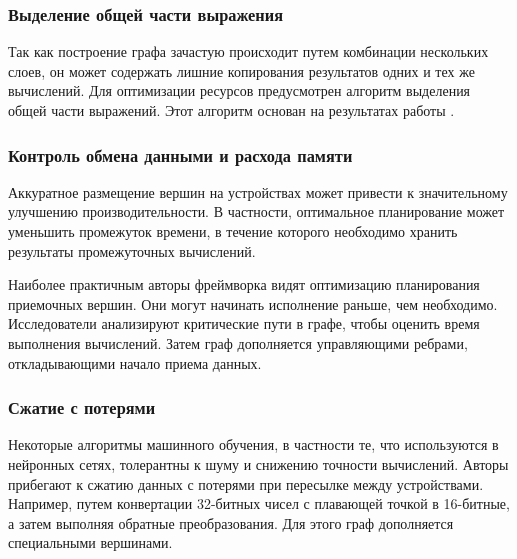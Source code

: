 \subsubsection{Выделение общей части выражения}
Так как построение графа зачастую происходит путем комбинации нескольких слоев,
он может содержать лишние копирования результатов одних и тех же вычислений.
Для оптимизации ресурсов предусмотрен алгоритм выделения общей части выражений.
Этот алгоритм основан на результатах работы \cite{click}.

\subsubsection{Контроль обмена данными и расхода памяти}

Аккуратное размещение вершин на устройствах может привести к значительному
улучшению производительности. В частности, оптимальное планирование может
уменьшить промежуток времени, в течение которого необходимо хранить результаты
промежуточных вычислений.

Наиболее практичным авторы фреймворка видят оптимизацию планирования приемочных
вершин. Они могут начинать исполнение раньше, чем необходимо. Исследователи
анализируют критические пути в графе, чтобы оценить время выполнения вычислений.
Затем граф дополняется управляющими ребрами, откладывающими начало приема данных.

\subsubsection{Сжатие с потерями}

Некоторые алгоритмы машинного обучения, в частности те, что используются в
нейронных сетях, толерантны к шуму и снижению точности вычислений. Авторы
прибегают к сжатию данных с потерями при пересылке между устройствами. Например,
путем конвертации 32-битных чисел с плавающей точкой в 16-битные, а затем
выполняя обратные преобразования. Для этого граф дополняется специальными
вершинами.
